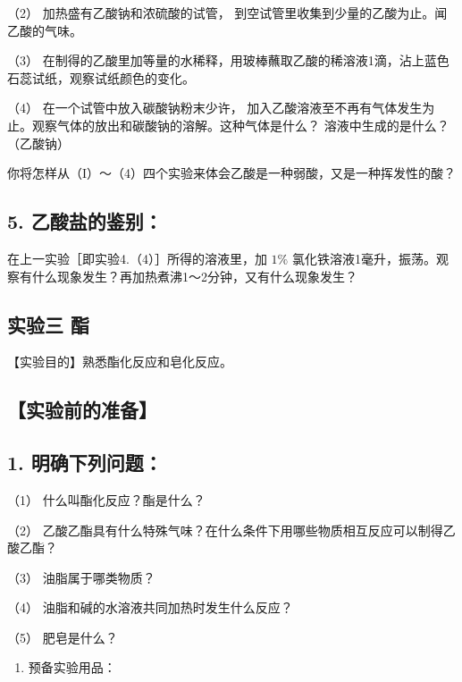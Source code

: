 （2） 加热盛有乙酸钠和浓硫酸的试管，
到空试管里收集到少量的乙酸为止。闻乙酸的气味。

（3）
在制得的乙酸里加等量的水稀释，用玻棒蘸取乙酸的稀溶液1滴，沾上蓝色石蕊试纸，观察试纸颜色的变化。

（4） 在一个试管中放入碳酸钠粉末少许，
加入乙酸溶液至不再有气体发生为止。观察气体的放出和碳酸钠的溶解。这种气体是什么？
溶液中生成的是什么？ （乙酸钠）

你将怎样从（I）～（4）四个实验来体会乙酸是一种弱酸，又是一种挥发性的酸？

\subsection{5. 乙酸盐的鉴别：}

在上一实验［即实验4.（4）］所得的溶液里，加 \(1\%\)
氯化铁溶液1毫升，振荡。观察有什么现象发生？再加热煮沸1～2分钟，又有什么现象发生？

\subsection{实验三 酯}

【实验目的】熟悉酯化反应和皂化反应。

\subsection{【实验前的准备】}

\subsection{1. 明确下列问题：}

（1） 什么叫酯化反应？酯是什么？

（2）
乙酸乙酯具有什么特殊气味？在什么条件下用哪些物质相互反应可以制得乙酸乙酯？

（3） 油脂属于哪类物质？

（4） 油脂和碱的水溶液共同加热时发生什么反应？

（5） 肥皂是什么？

\begin{enumerate}[start=2]
\item
  预备实验用品：
\end{enumerate}

